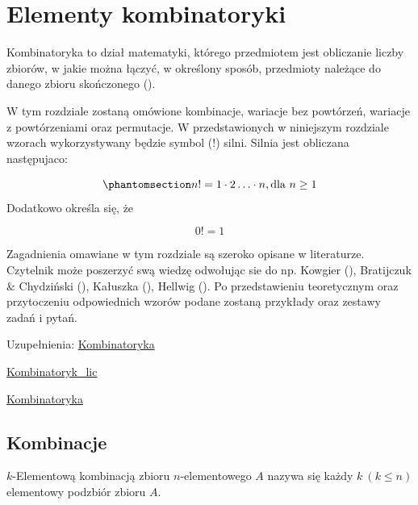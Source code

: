 \documentclass[
  letterpaper,
  DIV=11,
  numbers=noendperiod]{scrreprt}
\begin{document}

\chapter{Elementy kombinatoryki}\label{elementy-kombinatoryki}

Kombinatoryka to dział matematyki, którego przedmiotem jest obliczanie
liczby zbiorów, w jakie można łączyć, w określony sposób, przedmioty
należące do danego zbioru skończonego
().

W tym rozdziale zostaną omówione kombinacje, wariacje bez powtórzeń,
wariacje z powtórzeniami oraz permutacje. W przedstawionych w niniejszym
rozdziale wzorach wykorzystywany będzie symbol (!) silni. Silnia jest
obliczana następujaco:

\begin{equation}\phantomsection\label{eq-silnia}{n! = 1 \cdot 2 \ldots \cdot n, \text{dla } n \ge 1}\end{equation}
Dodatkowo określa się, że

\[0! = 1\]

Zagadnienia omawiane w tym rozdziale są szeroko opisane w literaturze.
Czytelnik może poszerzyć swą wiedzę odwołując sie do np. Kowgier
(), Bratijczuk \& Chydziński
(), Kałuszka
(), Hellwig
(). Po przedstawieniu
teoretycznym oraz przytoczeniu odpowiednich wzorów podane zostaną
przykłady oraz zestawy zadań i pytań.

Uzupełnienia:
\href{https://www.matemaks.pl/kombinatoryka.html}{Kombinatoryka}

\href{https://www.edukator.pl/resources/page/kombinatoryka-i-rachunek-prawdopodobienstwa/11041}{Kombinatoryk\_lic}

\href{https://www.math.edu.pl/kombinatoryka}{Kombinatoryka}

\section{Kombinacje}\label{kombinacje}

\begin{tcolorbox}[enhanced jigsaw, toprule=.15mm, title=\textcolor{quarto-callout-note-color}{\faInfo}\hspace{0.5em}{Kombinacje}, breakable, coltitle=black, titlerule=0mm, colbacktitle=quarto-callout-note-color!10!white, opacitybacktitle=0.6, opacityback=0, bottomtitle=1mm, left=2mm, arc=.35mm, leftrule=.75mm, bottomrule=.15mm, rightrule=.15mm, toptitle=1mm, colframe=quarto-callout-note-color-frame, colback=white]

\(k\)-Elementową kombinacją zbioru \(n\)-elementowego \(A\) nazywa się
każdy \(k \ (k \le n)\) elementowy podzbiór zbioru \(A\).

\end{tcolorbox}
\end{document}
